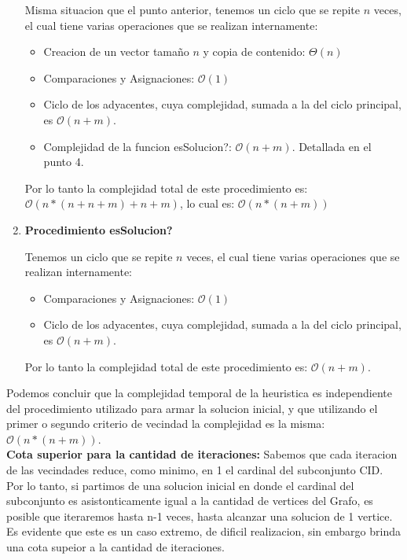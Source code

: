 \begin{enumerate}
    Misma situacion que el punto anterior, tenemos un ciclo que se repite $n$ veces, el cual tiene varias operaciones que se realizan internamente:
  \begin{itemize}
    \item Creacion de un vector tamaño $n$ y copia de contenido: $\Theta{(n)}$
    \item Comparaciones y Asignaciones: $\mathcal{O}(1)$
    \item Ciclo de los adyacentes, cuya complejidad, sumada a la del ciclo principal, es $\mathcal{O}(n + m)$.
    \item Complejidad de la funcion esSolucion?: $\mathcal{O}(n + m)$. Detallada en el punto 4.
  \end{itemize}
  Por lo tanto la complejidad total de este procedimiento es: $\mathcal{O}(n*(n + n + m) + n + m)$, lo cual es: $\mathcal{O}(n*(n + m))$

  \item \textbf{Procedimiento esSolucion?}

    Tenemos un ciclo que se repite $n$ veces, el cual tiene varias operaciones que se realizan internamente:
  \begin{itemize}
    \item Comparaciones y Asignaciones: $\mathcal{O}(1)$
    \item Ciclo de los adyacentes, cuya complejidad, sumada a la del ciclo principal, es $\mathcal{O}(n + m)$.
  \end{itemize}
  Por lo tanto la complejidad total de este procedimiento es: $\mathcal{O}(n + m)$.

\end{enumerate}

Podemos concluir que la complejidad temporal de la heuristica es independiente del procedimiento utilizado para armar la solucion inicial, y que utilizando el primer o segundo criterio de vecindad la complejidad es la misma: $\mathcal{O}(n*(n + m))$.\\

\textbf{Cota superior para la cantidad de iteraciones:}
Sabemos que cada iteracion de las vecindades reduce, como minimo, en 1 el cardinal del subconjunto CID. Por lo tanto, si partimos de una solucion inicial en donde el cardinal del subconjunto es asistonticamente igual a la cantidad de vertices del Grafo, es posible que iteraremos hasta n-1 veces, hasta alcanzar una solucion de 1 vertice. Es evidente que este es un caso extremo, de dificil realizacion, sin embargo brinda una cota supeior a la cantidad de iteraciones.

